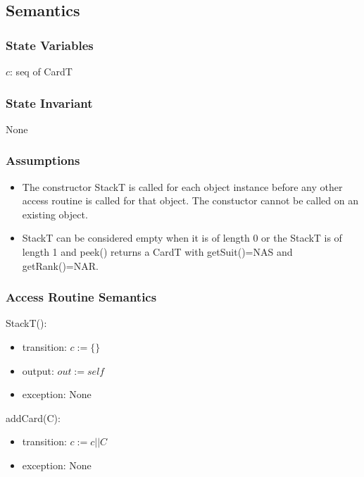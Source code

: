 \documentclass[12pt]{article}
\newcommand{\m}[1]{\mbox{#1}}
\begin{document}
\subsection* {Semantics}

\subsubsection* {State Variables}

$c$: seq of CardT\\

\subsubsection* {State Invariant}

None

\subsubsection* {Assumptions}

\begin{itemize}
    \item The constructor StackT is called for each object instance
    before any other access routine is called for that object. The
    constuctor cannot be called on an existing object.
    \item StackT can be considered empty when it is of length 0 or the
    StackT is of length 1 and peek() returns a CardT with getSuit()=\m{NAS}
    and getRank()=\m{NAR}.
\end{itemize}

\subsubsection* {Access Routine Semantics}

StackT():
\begin{itemize}
    \item transition: $c := \{\}$
    \item output: $out := \mathit{self}$
    \item exception: None
\end{itemize}

\noindent addCard(C):
\begin{itemize}
    \item transition: $c := c||C$
    \item exception: None
\end{itemize}
\end{document}
